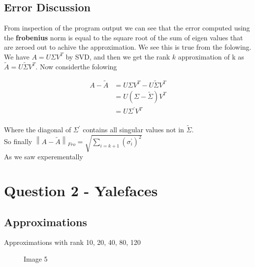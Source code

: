 \documentclass[11pt, a4]{article}
\newcommand{\norm}[1]{\left\lVert#1\right\rVert}
\begin{document}
\subsection{Error Discussion}
From inspection of the program output we can see that the error computed using the \textbf{frobenius} norm is equal to the square root of the sum of eigen values that are zeroed out to achive the approximation. We see this is true from the folowing. We have $A = U \Sigma V^{T}$ by SVD, and then we get the rank $k$ approximation of k as $\widetilde{A} = U \widetilde{\Sigma} V^{T}$. Now considerthe folowing

\begin{equation}
\begin{aligned}
	A - \widetilde{A} &= U \Sigma V^{T} - U \widetilde{\Sigma} V^{T} \\&= U (\Sigma - \widetilde{\Sigma}) V^{T} \\&= U \Sigma^\prime V^{T}
\end{aligned}
\end{equation}
\\
Where the diagonal of $\Sigma^\prime$ contains all singular values not in $\widetilde{\Sigma}$.\\

So finally $\norm{A - \widetilde{A}}_{Fro} = \sqrt{\sum_{i=k+1} (\sigma_i^\prime)^2}$ \\
As we saw experementally


\section{Question 2 - Yalefaces}
\subsection{Approximations}
Approximations with rank 10, 20, 40, 80, 120
\begin{figure}[H]
	\centering
	\qquad
	\qquad
	\qquad
	\qquad
	\caption{Image 5}
\end{figure}
\end{document}
